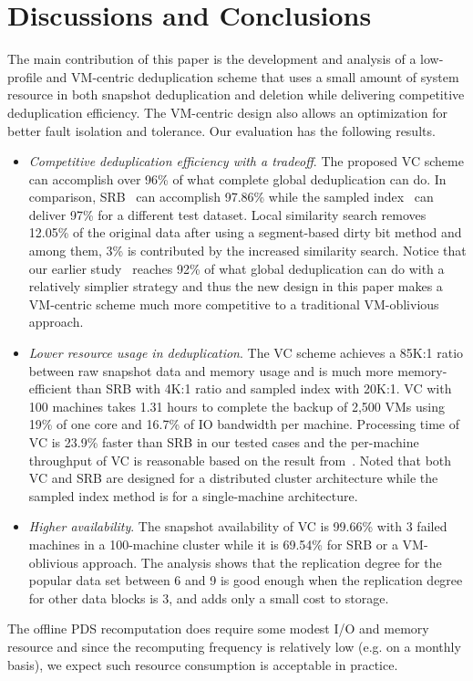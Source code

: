 \section{Discussions and Conclusions}
\label{sect:conclusion}
The main contribution of this paper is the development and analysis of a low-profile and VM-centric deduplication scheme that
uses  a small amount of system resource in both snapshot deduplication and deletion
while delivering competitive deduplication efficiency.
The VM-centric design also allows an optimization for  better fault isolation and tolerance.
Our evaluation has the following results.
\begin{itemize}
\item {\em Competitive deduplication efficiency with a tradeoff}. 
The proposed VC scheme 
can accomplish over  96\% of what complete global
deduplication can do. In comparison, SRB~\cite{Dong2011,extreme_binning09}
can accomplish 97.86\% while 
the sampled index~\cite{Guo2011} can deliver 97\% for a different test dataset. 
Local similarity search removes 12.05\% of the original data after using a segment-based
 dirty bit method and among them, 3\% is contributed by the increased similarity search.
Notice that our earlier study~\cite{WeiZhangIEEE} reaches 92\% of what global deduplication can do
with a relatively simplier strategy and thus the new design in this paper makes a
VM-centric scheme much more competitive to a traditional VM-oblivious approach.
\item {\em Lower resource usage in deduplication}. 
The VC scheme achieves a 85K:1 ratio between raw snapshot data and memory usage
and is much more memory-efficient than 
SRB  with 4K:1 ratio and sampled index with 20K:1.
VC with 100 machines takes 1.31 hours to complete the backup of 2,500 VMs
using 19\% of one core and 16.7\% of IO bandwidth per machine. 
Processing time of VC is 23.9\% faster  than SRB in our tested cases
and the per-machine throughput of VC is reasonable based on the result 
from~\cite{Guo2011}. 
Noted that both VC and SRB are designed for a distributed cluster architecture while
the sampled index method is for a single-machine architecture.
\item {\em Higher availability}. 
The snapshot availability of VC is 99.66\% with 3 failed machines in a 100-machine cluster
while it is 69.54\% for  SRB or a VM-oblivious approach.
The analysis shows that the replication degree
for the popular data set between 6 and 9 is good enough when the replication degree
for other data blocks is 3, and adds only a small cost to storage.
\end{itemize}
The offline PDS recomputation does require some modest I/O and memory resource and 
since the recomputing frequency is relatively low (e.g. on a monthly basis), we expect such resource
consumption is acceptable in practice.

